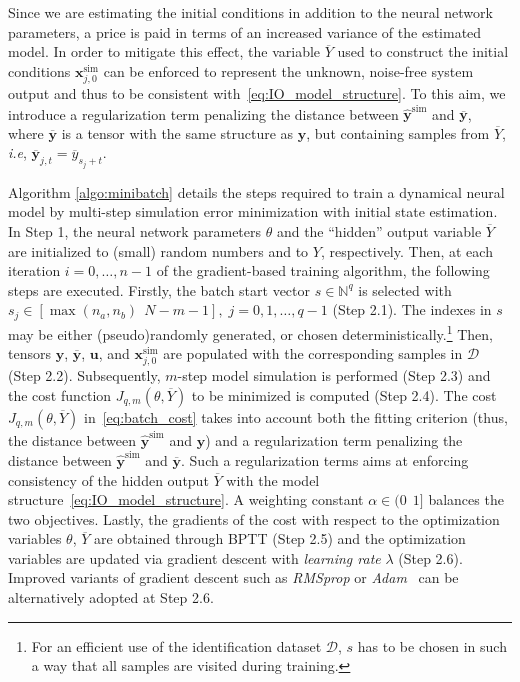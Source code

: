 \documentclass{article}
\newcommand{\batchsize}{q}
\newcommand{\seqlen}{m}
\newcommand{\nsamp}{N}
\newcommand{\tens}[1]{\mathbf{#1}}
\newcommand{\Yid}{Y}
\newcommand{\Did}{{\mathcal{D}}}
\newcommand{\hidden}[1]{\overline{#1}}
\begin{document}
Since we are estimating the initial conditions in addition to the neural network parameters, a price is paid in terms of an increased variance of the estimated model. In order to mitigate this effect, 
the variable  $\hidden{Y}$ used to construct the initial conditions $\tens{x}^{\mathrm{sim}}_{j,0}$ can be enforced to  represent the unknown, noise-free system output and thus to be consistent with~\eqref{eq:IO_model_structure}. To this aim, we introduce a regularization term   penalizing the distance between  $\hat {\tens{y}}^{\mathrm{sim}}$ and $\hidden{\tens{y}}$, where ${\hidden{\tens{y}}}$ is a tensor with the same structure as ${\tens{y}}$, but   containing samples from $\hidden{Y}$, \emph{i.e}, ${\hidden{\tens{y}}}_{j,t} = \hidden{y}_{s_{j}+t}$. 

Algorithm \ref{algo:minibatch} details   the steps required to train a dynamical neural model by multi-step simulation error minimization with initial state estimation. In Step 1, the neural network parameters $\theta$ and the ``hidden'' output variable $\hidden{Y}$ are initialized to (small) random numbers and to $\Yid$, respectively. Then, at each iteration $i=0,\ldots,n-1$ of the gradient-based training algorithm, the following steps are executed.   
Firstly, the batch start vector $s \in \mathbb{N}^\batchsize$ is selected with $s_j \in [\max({n_a, n_b}) \ \  \nsamp-\seqlen-1],\; j=0,1,\dots,\batchsize-1$ (Step 2.1). The indexes in $s$ may be either (pseudo)randomly generated, or chosen deterministically.\footnote{For an efficient use of the identification dataset $\Did$, $s$ has to be chosen in such a way that all samples are visited during training.}  
Then,  tensors ${{\tens{y}}}$, ${\hidden{\tens{y}}}$, ${{\tens{u}}}$, and $\tens{x}^{\mathrm{sim}}_{j,0}$ are populated with the corresponding samples in $\Did$ (Step 2.2). 
Subsequently, $m$-step model simulation is performed (Step 2.3) and the cost function $J_{\batchsize,\seqlen}(\theta,\hidden{Y})$ to be minimized is computed (Step 2.4). The cost $J_{\batchsize,\seqlen}(\theta,\hidden{Y})$ in~\eqref{eq:batch_cost} takes into account both the fitting criterion (thus, the distance between $\hat {\tens{y}}^{\mathrm{sim}}$ and $ {\tens{y}}$) and a regularization term penalizing the distance between $\hat {\tens{y}}^{\mathrm{sim}}$ and 
$\hidden{\tens{y}}$. Such a regularization terms aims at enforcing consistency of the hidden output $\hidden Y$ with the model structure~\eqref{eq:IO_model_structure}. A weighting constant     $\alpha \in (0 \ \ 1]$ balances the two objectives.  
Lastly, the gradients of the cost with respect to the optimization variables $\theta$, $\hidden{Y}$ are obtained through BPTT (Step 2.5) and the optimization variables are updated via gradient descent with \emph{learning rate} $\lambda$ (Step 2.6). Improved variants of  gradient descent  such as \emph{RMSprop} or \emph{Adam}~\citep{kingma2014adam} can be alternatively adopted at Step 2.6.
\end{document}
